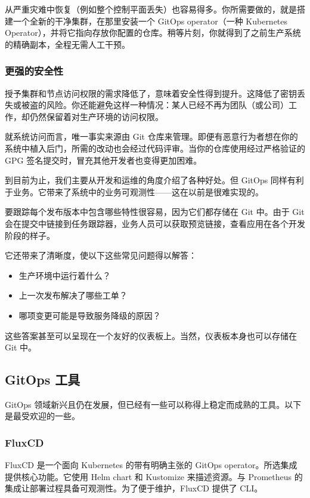 从严重灾难中恢复（例如整个控制平面丢失）也容易得多。你所需要做的，就是搭建一个全新的干净集群，在那里安装一个 GitOps operator（一种 Kubernetes Operator），并将它指向存放你配置的仓库。稍等片刻，你就得到了之前生产系统的精确副本，全程无需人工干预。

\subsubsection{更强的安全性}

授予集群和节点访问权限的需求降低了，意味着安全性得到提升。这降低了密钥丢失或被盗的风险。你还能避免这样一种情况：某人已经不再为团队（或公司）工作，却仍然保留着对生产环境的访问权限。

\label{idx:2079}
就系统访问而言，唯一事实来源由 Git 仓库来管理。即便有恶意行为者想在你的系统中植入后门，所需的改动也会经过代码评审。当你的仓库使用经过严格验证的 GPG 签名提交时，冒充其他开发者也变得更加困难。

到目前为止，我们主要从开发和运维的角度介绍了各种好处。但 GitOps 同样有利于业务。它带来了系统中的业务可观测性——这在以前是很难实现的。

要跟踪每个发布版本中包含哪些特性很容易，因为它们都存储在 Git 中。由于 Git 会在提交中链接到任务跟踪器，业务人员可以获取预览链接，查看应用在各个开发阶段的样子。

\label{idx:2080}
它还带来了清晰度，使以下这些常见问题得以解答：

\begin{itemize}
\item 生产环境中运行着什么？
\item 上一次发布解决了哪些工单？
\item 哪项变更可能是导致服务降级的原因？
\end{itemize}

这些答案甚至可以呈现在一个友好的仪表板上。当然，仪表板本身也可以存储在 Git 中。

\subsection{GitOps 工具}

\label{idx:2081}
GitOps 领域新兴且仍在发展，但已经有一些可以称得上稳定而成熟的工具。以下是最受欢迎的一些。

\subsubsection{FluxCD}

\label{idx:2082}
\label{idx:2083}
FluxCD 是一个面向 Kubernetes 的带有明确主张的 GitOps operator。所选集成提供核心功能。它使用 Helm chart 和 Kustomize 来描述资源。与 Prometheus 的集成让部署过程具备可观测性。为了便于维护，FluxCD 提供了 CLI。

